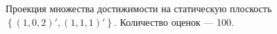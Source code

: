 \documentclass[10pt, a4paper]{article}
\begin{document}
\begin{figure}[H]
\caption{Проекция множества достижимости на статическую плоскость $\left\{(1,0,2)',(1,1,1)'\right\}$. Количество оценок --- 100.}
\end{figure}
\end{document}
